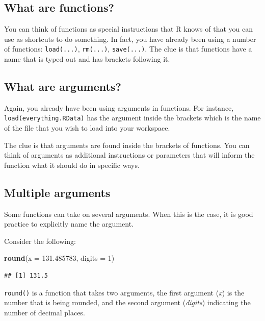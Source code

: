 \documentclass[
]{book}
\newenvironment{Shaded}{\begin{snugshade}}{\end{snugshade}}
\newcommand{\AttributeTok}[1]{\textcolor[rgb]{0.13,0.29,0.53}{#1}}
\newcommand{\DecValTok}[1]{\textcolor[rgb]{0.00,0.00,0.81}{#1}}
\newcommand{\FloatTok}[1]{\textcolor[rgb]{0.00,0.00,0.81}{#1}}
\newcommand{\FunctionTok}[1]{\textcolor[rgb]{0.13,0.29,0.53}{\textbf{#1}}}
\newcommand{\NormalTok}[1]{#1}
\begin{document}
\subsection{What are functions?}\label{what-are-functions}

You can think of functions as special instructions that R knows of that you can use as shortcuts to do something. In fact, you have already been using a number of functions: \texttt{load(...)}, \texttt{rm(...)}, \texttt{save(...)}. The clue is that functions have a name that is typed out and has brackets following it.

\subsection{What are arguments?}\label{what-are-arguments}

Again, you already have been using arguments in functions. For instance, \texttt{load(\textquotesingle{}everything.RData\textquotesingle{})} has the argument inside the brackets which is the name of the file that you wish to load into your workspace.

The clue is that arguments are found inside the brackets of functions. You can think of arguments as additional instructions or parameters that will inform the function what it should do in specific ways.

\subsection{Multiple arguments}\label{multiple-arguments}

Some functions can take on several arguments. When this is the case, it is good practice to explicitly name the argument.

Consider the following:

\begin{Shaded}
\begin{Highlighting}[]
\FunctionTok{round}\NormalTok{(}\AttributeTok{x =} \FloatTok{131.485783}\NormalTok{, }\AttributeTok{digits =} \DecValTok{1}\NormalTok{)}
\end{Highlighting}
\end{Shaded}

\begin{verbatim}
## [1] 131.5
\end{verbatim}

\texttt{round()} is a function that takes two arguments, the first argument (\emph{x}) is the number that is being rounded, and the second argument (\emph{digits}) indicating the number of decimal places.
\end{document}
